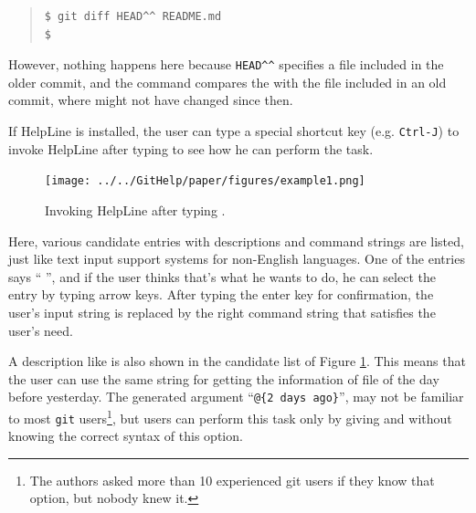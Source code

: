 \documentclass[manuscript,anonymous,review]{acmart}
\def\HL{\textsf{HelpLine}}
\def\GIT{\texttt{git}}
\begin{document}

\begin{quote}
\begin{verbatim}
$ git diff HEAD^^ README.md
$
\end{verbatim}
\end{quote}

However, nothing happens here because
\verb|HEAD^^|
specifies a file included in the older commit,
and the command compares the
 with the file included in an old commit, where
 might not have changed since then.

If {\HL} is installed,
the user can type a special shortcut key
(e.g. \texttt{Ctrl-J})
to invoke {\HL} after typing  to see how he can
perform the task.

\begin{figure}[H]
  \texttt{[image: ../../GitHelp/paper/figures/example1.png]}
  \caption{Invoking {\HL} after typing .}
  \label{example1}
\end{figure}

Here, various candidate entries with descriptions and command strings are listed,
just like text input support systems for non-English languages.
One of the entries says
``  '',
and if the user thinks that's what he wants to do,
he can select the entry by typing arrow keys.
After typing the enter key for confirmation,
the user's input string is replaced by the right command string
that satisfies the user's need.

A description like  is also shown in the candidate list
of Figure \ref{example1}.
This means that the user can use the same string 
for getting the information of  file of the day before yesterday.
The generated argument
``{\smallfont\verb|@{2 days ago}|}'',
may not be familiar to most {\GIT} users\footnote{
  The authors asked more than 10 experienced git users if they know that option,
  but nobody knew it.
},
but users can perform this task only by giving  and 
without knowing the correct syntax of this option.
\end{document}
